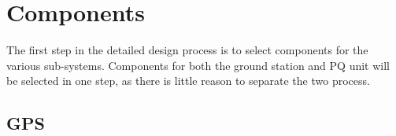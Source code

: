 \section{Components}

The first step in the detailed design process is to select components for the various sub-systems. Components for both the ground station and PQ unit will be selected in one step, as there is little reason to separate the two process.

\subsection{GPS}

